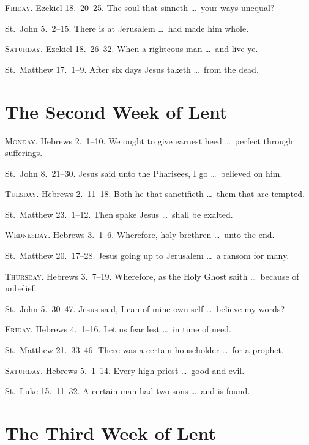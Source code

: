 {\scshape Friday.}  Ezekiel 18.~20–25.   The soul that sinneth \ldots\ your ways unequal?

 St.~John 5.~2–15.   There is at Jerusalem \ldots\ had made him whole.

{\scshape Saturday.}  Ezekiel 18.~26–32.   When a righteous man \ldots\ and live ye.

 St.~Matthew 17.~1–9.   After six days Jesus taketh \ldots\ from the dead.

\section{The Second Week of Lent}

{\scshape Monday.}  Hebrews 2.~1–10.   We ought to give earnest heed \ldots\ perfect through sufferings.

 St.~John 8.~21–30.   Jesus said unto the Pharisees, I go \ldots\ believed on him.

{\scshape Tuesday.}  Hebrews 2.~11–18.   Both he that sanctifieth \ldots\ them that are tempted.

 St.~Matthew 23.~1–12.   Then spake Jesus \ldots\ shall be exalted.

{\scshape Wednesday.}  Hebrews 3.~1–6.   Wherefore, holy brethren \ldots\ unto the end.

 St.~Matthew 20.~17–28.   Jesus going up to Jerusalem \ldots\ a ransom for many.
    
{\scshape Thursday.}  Hebrews 3.~7–19.   Wherefore, as the Holy Ghost saith \ldots\ because of unbelief.

 St.~John 5.~30–47.   Jesus said, I can of mine own self \ldots\ believe my words?

{\scshape Friday.}  Hebrews 4.~1–16.   Let us fear lest \ldots\ in time of need.

 St.~Matthew 21.~33–46.   There was a certain householder \ldots\ for a prophet.

{\scshape Saturday.}  Hebrews 5.~1–14.   Every high priest \ldots\ good and evil.

 St.~Luke 15.~11–32.   A certain man had two sons \ldots\ and is found.

\section{The Third Week of Lent}

